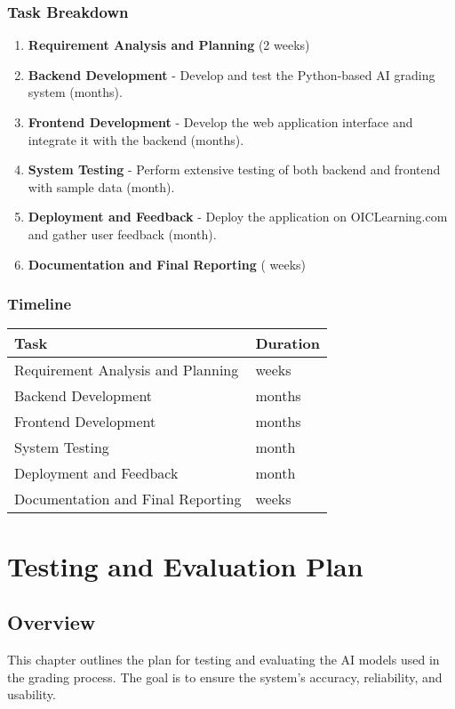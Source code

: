 \documentclass[ms,twoside,print]{nuthesis}
\begin{document}
\subsection{Task Breakdown}
\begin{enumerate}
    \item \textbf{Requirement Analysis and Planning} (2 weeks)
    \item \textbf{Backend Development} - Develop and test the Python-based AI grading system (months).
    \item \textbf{Frontend Development} - Develop the web application interface and integrate it with the backend (months).
    \item \textbf{System Testing} - Perform extensive testing of both backend and frontend with sample data (month).
    \item \textbf{Deployment and Feedback} - Deploy the application on OICLearning.com and gather user feedback (month).
    \item \textbf{Documentation and Final Reporting} ( weeks)
\end{enumerate}

\subsection{Timeline}

\begin{center}
\begin{tabular}{ll}
\toprule
\textbf{Task} & \textbf{Duration} \\
\midrule
Requirement Analysis and Planning &  weeks \\
Backend Development &  months \\
Frontend Development &  months \\
System Testing &  month \\
Deployment and Feedback &  month \\
Documentation and Final Reporting &  weeks \\
\bottomrule
\end{tabular}
\end{center}

\chapter{Testing and Evaluation Plan}
\section{Overview}
This chapter outlines the plan for testing and evaluating the AI models used in the grading process. The goal is to ensure the system's accuracy, reliability, and usability.
\end{document}

